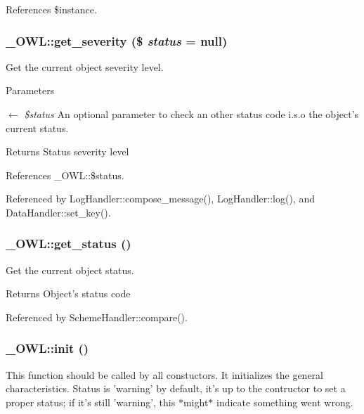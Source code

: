 References \$instance.

\subsubsection[{get\_\-severity}]{\setlength{\rightskip}{0pt plus 5cm}\_\-OWL::get\_\-severity (\$ {\em status} = {\ttfamily null})}\label{class__OWL_adf9509ef96858be7bdd9414c5ef129aa}
Get the current object severity level.


\begin{DoxyParams}{Parameters}
\item[\mbox{$\leftarrow$} {\em \$status}]An optional parameter to check an other status code i.s.o the object's current status. \end{DoxyParams}
\begin{DoxyReturn}{Returns}
Status severity level 
\end{DoxyReturn}


References \_\-OWL::\$status.



Referenced by LogHandler::compose\_\-message(), LogHandler::log(), and DataHandler::set\_\-key().

\subsubsection[{get\_\-status}]{\setlength{\rightskip}{0pt plus 5cm}\_\-OWL::get\_\-status ()}\label{class__OWL_a99ec771fa2c5c279f80152cc09e489a8}
Get the current object status.

\begin{DoxyReturn}{Returns}
Object's status code 
\end{DoxyReturn}


Referenced by SchemeHandler::compare().

\subsubsection[{init}]{\setlength{\rightskip}{0pt plus 5cm}\_\-OWL::init ()}\label{class__OWL_ae0ef3ded56e8a6b34b6461e5a721cd3e}
This function should be called by all constuctors. It initializes the general characteristics. Status is 'warning' by default, it's up to the contructor to set a proper status; if it's still 'warning', this $\ast$might$\ast$ indicate something went wrong. 

